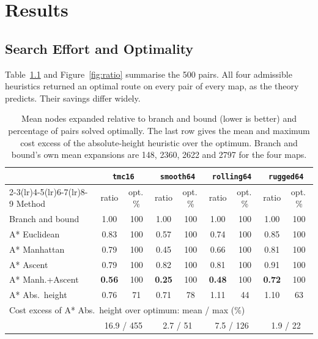 \chapter{Results}
\label{ch:results}

\section{Search Effort and Optimality}

Table~\ref{tab:main} and Figure~\ref{fig:ratio} summarise the 500 pairs. All four admissible heuristics returned an optimal route on every pair of every map, as the theory predicts. Their savings differ widely.

\begin{table}[ht]
\centering
\caption{Mean nodes expanded relative to branch and bound (lower is better) and percentage of pairs solved optimally. The last row gives the mean and maximum cost excess of the absolute-height heuristic over the optimum. Branch and bound's own mean expansions are 148, 2360, 2622 and 2797 for the four maps.}
\label{tab:main}
\small
\begin{tabular}{l cc cc cc cc}
\toprule
& \multicolumn{2}{c}{\texttt{tmc16}} & \multicolumn{2}{c}{\texttt{smooth64}} & \multicolumn{2}{c}{\texttt{rolling64}} & \multicolumn{2}{c}{\texttt{rugged64}} \\
\cmidrule(lr){2-3}\cmidrule(lr){4-5}\cmidrule(lr){6-7}\cmidrule(lr){8-9}
Method & ratio & opt.\,\% & ratio & opt.\,\% & ratio & opt.\,\% & ratio & opt.\,\% \\
\midrule
Branch and bound & 1.00 & 100 & 1.00 & 100 & 1.00 & 100 & 1.00 & 100 \\
A* Euclidean     & 0.83 & 100 & 0.57 & 100 & 0.74 & 100 & 0.85 & 100 \\
A* Manhattan     & 0.79 & 100 & 0.45 & 100 & 0.66 & 100 & 0.81 & 100 \\
A* Ascent        & 0.79 & 100 & 0.82 & 100 & 0.81 & 100 & 0.91 & 100 \\
A* Manh.+Ascent  & \textbf{0.56} & 100 & \textbf{0.25} & 100 & \textbf{0.48} & 100 & \textbf{0.72} & 100 \\
A* Abs.\ height  & 0.76 & 71 & 0.71 & 78 & 1.11 & 44 & 1.10 & 63 \\
\midrule
\multicolumn{9}{l}{Cost excess of A* Abs.\ height over optimum: mean / max (\%)} \\
& \multicolumn{2}{c}{16.9 / 455} & \multicolumn{2}{c}{2.7 / 51} & \multicolumn{2}{c}{7.5 / 126} & \multicolumn{2}{c}{1.9 / 22} \\
\bottomrule
\end{tabular}
\end{table}

